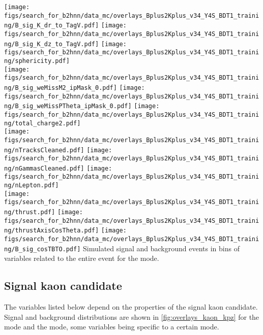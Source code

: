 {
\texttt{[image: figs/search\_for\_b2hnn/data\_mc/overlays\_Bplus2Kplus\_v34\_Y4S\_BDT1\_training/B\_sig\_K\_dr\_to\_TagV.pdf]}
\texttt{[image: figs/search\_for\_b2hnn/data\_mc/overlays\_Bplus2Kplus\_v34\_Y4S\_BDT1\_training/B\_sig\_K\_dz\_to\_TagV.pdf]}
\texttt{[image: figs/search\_for\_b2hnn/data\_mc/overlays\_Bplus2Kplus\_v34\_Y4S\_BDT1\_training/sphericity.pdf]}\\
\texttt{[image: figs/search\_for\_b2hnn/data\_mc/overlays\_Bplus2Kplus\_v34\_Y4S\_BDT1\_training/B\_sig\_weMissM2\_ipMask\_0.pdf]}
\texttt{[image: figs/search\_for\_b2hnn/data\_mc/overlays\_Bplus2Kplus\_v34\_Y4S\_BDT1\_training/B\_sig\_weMissPTheta\_ipMask\_0.pdf]}
\texttt{[image: figs/search\_for\_b2hnn/data\_mc/overlays\_Bplus2Kplus\_v34\_Y4S\_BDT1\_training/total\_charge2.pdf]}\\
\texttt{[image: figs/search\_for\_b2hnn/data\_mc/overlays\_Bplus2Kplus\_v34\_Y4S\_BDT1\_training/nTracksCleaned.pdf]}
\texttt{[image: figs/search\_for\_b2hnn/data\_mc/overlays\_Bplus2Kplus\_v34\_Y4S\_BDT1\_training/nGammasCleaned.pdf]}
\texttt{[image: figs/search\_for\_b2hnn/data\_mc/overlays\_Bplus2Kplus\_v34\_Y4S\_BDT1\_training/nLepton.pdf]}\\
\texttt{[image: figs/search\_for\_b2hnn/data\_mc/overlays\_Bplus2Kplus\_v34\_Y4S\_BDT1\_training/thrust.pdf]}
\texttt{[image: figs/search\_for\_b2hnn/data\_mc/overlays\_Bplus2Kplus\_v34\_Y4S\_BDT1\_training/thrustAxisCosTheta.pdf]}
\texttt{[image: figs/search\_for\_b2hnn/data\_mc/overlays\_Bplus2Kplus\_v34\_Y4S\_BDT1\_training/B\_sig\_cosTBTO.pdf]}
}
{
Simulated signal and background events in bins of variables related to the entire event for the \BKpnn mode.
\overlaytext
}
\subsection{Signal kaon candidate} \label{sec:var_signal_kaon}
The variables listed below depend on the properties of the signal kaon candidate.
Signal and background distributions are shown in \cref{fig:overlays_kaon_kpz} for the \BKpnn mode and the \BKznn mode, some variables being specific to a certain mode.

